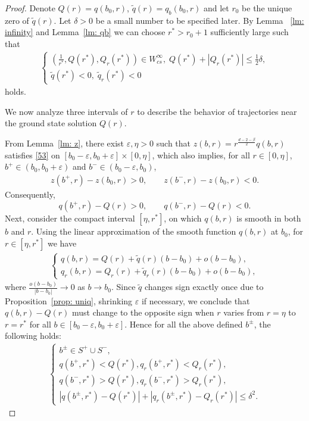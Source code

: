 \documentclass[12pt]{amsart}
\newcommand{\eps}{\varepsilon}
\begin{document}
\begin{proof}  Denote $Q(r)=q(b_0,r)$, $\tilde q(r)=q_b(b_0,r)$ and let $r_0$ be the unique zero of $\tilde q(r)$. Let $\delta>0$ be a small number to be specified later. By Lemma ~\ref{lm: infinity} and Lemma~\ref{lm: qb} we can choose $r^*>r_0+1$ sufficiently large such that 
\begin{align}\label{103}
\begin{cases}
(\tfrac 1{r^*}, Q(r^*), Q_r(r^*))\in W^{\infty}_{cs}, \; Q(r^*)+|Q_r(r^*)|\le \frac 12\delta,\\
 \tilde q(r^*)<0,\; \tilde q_{r}(r^*)<0
 \end{cases}
\end{align}
holds. 

We now analyze three intervals of $r$ to describe the behavior of trajectories near the ground state solution $Q(r)$. 

From Lemma~\ref{lm: z}, there exist $\varepsilon, \eta>0$ such that $z(b,r)=r^{\frac{d-2-\beta}2}q(b,r)$ satisfies \eqref{53} on $[b_0-\eps,b_0+\eps]\times[0,\eta]$, which also implies, for all $r\in[0,\eta]$, $b^+\in (b_0,b_0+\eps)$ and $b^-\in(b_0-\eps,b_0)$,
\begin{align*}
z(b^+,r)-z(b_0,r)>0, \qquad  z(b^-,r)-z(b_0,r)<0.
 \end{align*}
Consequently, 
\[
q(b^+,r)-Q(r)>0, \qquad q(b^-,r)-Q(r)<0.
\]
Next, consider the compact interval $[\eta,r^*]$, on which $q(b,r)$ is smooth in both $b$ and $r$. Using the linear approximation of the smooth function $q(b,r)$ at $b_0$, for $r\in [\eta,r^*]$ we have
\begin{align}\label{104}
\begin{cases}
q(b,r)=Q(r)+\tilde q(r)(b-b_0)+o(b-b_0), \\
q_r(b,r)=Q_r(r)+\tilde q_r(r)(b-b_0)+o(b-b_0),
\end{cases}
\end{align}
where $\frac {o(b-b_0)}{|b-b_0|} \to 0$ as $b\to b_0$.  Since $\tilde q$ changes sign exactly once due to Proposition~\ref{prop: uniq}, shrinking $\eps$ if necessary, we conclude that $q(b,r)-Q(r)$ must change to the opposite sign when $r$ varies from $r=\eta$ to $r=r^*$ for all $b\in [b_0-\eps, b_0+\eps]$.  Hence for all the above defined $b^{\pm}$, the following holds:
\begin{align}\label{105}
\begin{cases}
b^{\pm}\in S^+\cup S^-, \\
q(b^+, r^*)<Q(r^*), q_r(b^+, r^*)<Q_r(r^*),\\
q(b^-, r^*)>Q(r^*), q_r(b^-, r^*)>Q_r(r^*),\\
|q(b^\pm, r^*)-Q(r^*)|+|q_r(b^\pm, r^*)-Q_r(r^*)|\le \delta^2. 
\end{cases}
\end{align}





\end{proof}
\end{document}
